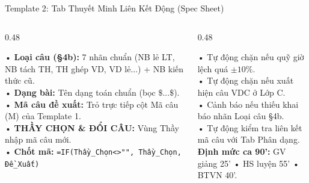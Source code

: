\documentclass[aspectratio=169,11pt]{beamer}
\begin{document}
\begin{frame}{Template 2: Tab Thuyết Minh Liên Kết Động (Spec Sheet)}
  \begin{columns}[T]
    \begin{column}{0.48\textwidth}
      \begin{tcolorbox}[slidecard, title=Cấu Trúc Ma Trận Dạng Bài]
        \scriptsize
        • \textbf{Loại câu (§4b):} 7 nhãn chuẩn (NB lẻ LT, NB tách TH, TH ghép VD, VD lẻ...) + NB kiến thức cũ.\\[3pt]
        • \textbf{Dạng bài:} Tên dạng toán chuẩn (bọc $\$...\$$).\\[3pt]
        • \textbf{Mã câu đề xuất:} Trỏ trực tiếp cột Mã câu (M) của Template 1.\\[3pt]
        • \textbf{THẦY CHỌN \& ĐỔI CÂU:} Vùng Thầy nhập mã câu mới.\\[3pt]
        • \textbf{Chốt mã:} \texttt{=IF(Thầy\_Chọn<>"", Thầy\_Chọn, Đề\_Xuất)}
      \end{tcolorbox}
    \end{column}

    \begin{column}{0.48\textwidth}
      \begin{tcolorbox}[accentcard, title=Gác Cổng Tự Động (thuyetminh\_gate)]
        \scriptsize
        • Tự động chặn nếu quỹ giờ lệch quá $\pm 10\%$.\\[3pt]
        • Tự động chặn nếu xuất hiện câu VDC ở Lớp C.\\[3pt]
        • Cảnh báo nếu thiếu khai báo nhãn Loại câu §4b.\\[3pt]
        • Tự động kiểm tra liên kết mã câu với Tab Phân dạng.\\[4pt]
        {\color{success}\textbf{Định mức ca 90':}} GV giảng 25' • HS luyện 55' • BTVN 40'.
      \end{tcolorbox}
    \end{column}
  \end{columns}
\end{frame}
\end{document}

